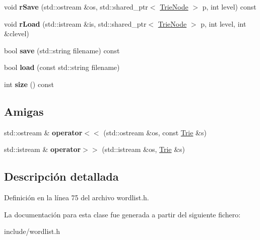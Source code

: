 \begin{DoxyCompactItemize}
\item 
\mbox{\label{classTrie_ab095672df317524d593a9b2730d33285}} 
void {\bfseries r\+Save} (std\+::ostream \&os, std\+::shared\+\_\+ptr$<$ \hyperlink{classTrieNode}{Trie\+Node} $>$ p, int level) const
\item 
\mbox{\label{classTrie_ac3a88126c73f3c62624933227c855a09}} 
void {\bfseries r\+Load} (std\+::istream \&is, std\+::shared\+\_\+ptr$<$ \hyperlink{classTrieNode}{Trie\+Node} $>$ p, int level, int \&clevel)
\item 
\mbox{\label{classTrie_aefeaac5452e2e930c330f56795b6c83e}} 
bool {\bfseries save} (std\+::string filename) const
\item 
\mbox{\label{classTrie_a24b124179d5e4ae7f84d80b21660aafb}} 
bool {\bfseries load} (const std\+::string filename)
\item 
\mbox{\label{classTrie_af1317f01af35b2b807dda69f2e37c6f1}} 
int {\bfseries size} () const
\end{DoxyCompactItemize}
\subsection*{Amigas}
\begin{DoxyCompactItemize}
\item 
\mbox{\label{classTrie_a5d7ad760deae225e8622a334a614bd27}} 
std\+::ostream \& {\bfseries operator$<$$<$} (std\+::ostream \&os, const \hyperlink{classTrie}{Trie} \&s)
\item 
\mbox{\label{classTrie_a52b5d1a4b919a0b97609d654110576c8}} 
std\+::istream \& {\bfseries operator$>$$>$} (std\+::istream \&os, \hyperlink{classTrie}{Trie} \&s)
\end{DoxyCompactItemize}


\subsection{Descripción detallada}


Definición en la línea 75 del archivo wordlist.\+h.



La documentación para esta clase fue generada a partir del siguiente fichero\+:\begin{DoxyCompactItemize}
\item 
include/wordlist.\+h\end{DoxyCompactItemize}
